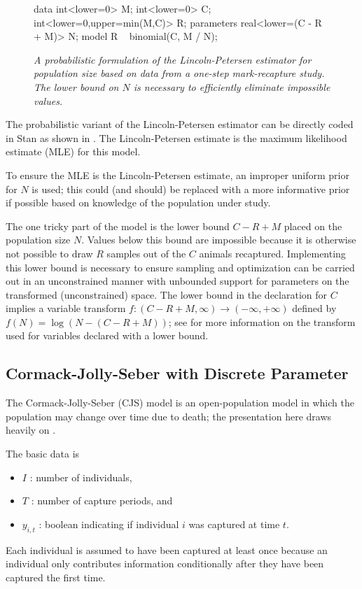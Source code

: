 %
\begin{figure}
\begin{stancode}
data {
  int<lower=0> M;
  int<lower=0> C;
  int<lower=0,upper=min(M,C)> R;
}
parameters {
  real<lower=(C - R + M)> N;
}
model {
  R ~ binomial(C, M / N);
}
\end{stancode}
\vspace*{-6pt}
\caption{\small\it A probabilistic formulation of the Lincoln-Petersen
estimator for population size based on data from a one-step
mark-recapture study.  The lower bound on $N$ is necessary to
efficiently eliminate impossible values.}%
\label{lincoln-petersen-model.figure}
\end{figure}
%
The probabilistic variant of the Lincoln-Petersen estimator can be
directly coded in Stan as shown in .
The Lincoln-Petersen estimate is the maximum likelihood estimate (MLE)
for this model.

To ensure the MLE is the Lincoln-Petersen estimate, an improper
uniform prior for $N$ is used; this could (and should) be replaced
with a more informative prior if possible based on knowledge of the
population under study.

The one tricky part of the model is the lower bound $C - R + M$ placed
on the population size $N$.  Values below this bound are impossible
because it is otherwise not possible to draw $R$ samples out of the
$C$ animals recaptured.  Implementing this lower bound is necessary to
ensure sampling and optimization can be carried out in an
unconstrained manner with unbounded support for parameters on the
transformed (unconstrained) space.  The lower bound in the declaration
for $C$ implies a variable transform $f : (C-R+M,\infty) \rightarrow
(-\infty,+\infty)$ defined by $f(N) = \log(N - (C - R + M))$; see
 for more information on the
transform used for variables declared with a lower bound.

\subsection{Cormack-Jolly-Seber with Discrete Parameter}

The Cormack-Jolly-Seber (CJS) model
\citep{Cormack:1964,Jolly:1965,Seber:1965} is an open-population model
in which the population may change over time due to death; the
presentation here draws heavily on \citep{Schofield:2007}.  

The basic data is
%
\begin{itemize}
\item $I$ : number of individuals, 
\item $T$ : number of capture periods, and
\item $y_{i,t}$ : boolean indicating if individual $i$ was captured at
  time $t$.
\end{itemize}
%
Each individual is assumed to have been captured at least once because
an individual only contributes information conditionally after they
have been captured the first time.


